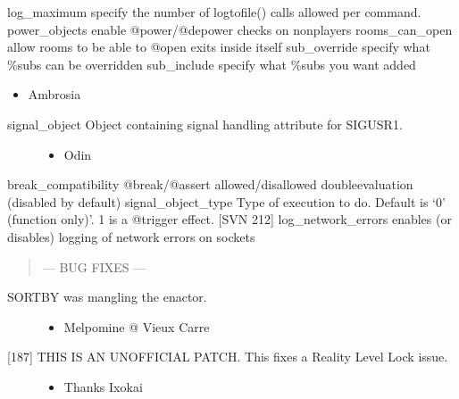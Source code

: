 \documentclass[letterpaper,10pt,english]{sphinxmanual}
\begin{document}
\sphinxAtStartPar
log\_maximum \sphinxhyphen{} specify the number of logtofile() calls allowed per command.
power\_objects \sphinxhyphen{} enable @power/@depower checks on non\sphinxhyphen{}players
rooms\_can\_open \sphinxhyphen{} allow rooms to be able to @open exits inside itself
sub\_override \sphinxhyphen{} specify what \%\sphinxhyphen{}subs can be overridden
sub\_include \sphinxhyphen{} specify what \%\sphinxhyphen{}subs you want added
\begin{itemize}
\item {} 
\sphinxAtStartPar
Ambrosia

\end{itemize}
\begin{description}
\item[{signal\_object \sphinxhyphen{} Object containing signal handling attribute for SIGUSR1.}] \leavevmode\begin{itemize}
\item {} 
\sphinxAtStartPar
Odin

\end{itemize}

\end{description}

\sphinxAtStartPar
break\_compatibility \sphinxhyphen{} @break/@assert allowed/disallowed double\sphinxhyphen{}evaluation (disabled by default)
signal\_object\_type \sphinxhyphen{} Type of execution to do.  Default is ‘0’ (function only)’.  1 is a @trigger effect. {[}SVN 212{]}
log\_network\_errors      \sphinxhyphen{} enables (or disables) logging of network errors on sockets
\begin{quote}

\sphinxAtStartPar
— BUG FIXES —
\end{quote}
\begin{description}
\item[{SORTBY was mangling the enactor.}] \leavevmode\begin{itemize}
\item {} 
\sphinxAtStartPar
Melpomine @ Vieux Carre

\end{itemize}

\item[{{[}18\sphinxhyphen{}7{]} THIS IS AN UNOFFICIAL PATCH.  This fixes a Reality Level Lock issue.}] \leavevmode\begin{itemize}
\item {} 
\sphinxAtStartPar
Thanks Ixokai

\end{itemize}

\end{description}
\end{document}
